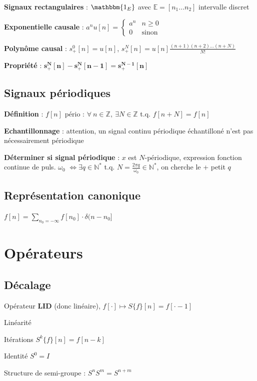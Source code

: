\textbf{Signaux rectangulaires} : $\mathbbm{1_E}$ avec $\mathbb{E} = [n_1\dots n_2]$ intervalle discret

\textbf{Exponentielle causale} : $a^nu[n] = \begin{cases} a^n & n\geq 0 \\0 & \text{sinon} \end{cases}$

\textbf{Polynôme causal} : $s_+^0[n] = u[n]$, $s_+^N[n] = u[n]\frac{(n+1)(n+2)\dots(n+N)}{N!}$

\textbf{Propriété} : $\mathbf{s_+^N[n] - s_+^N[n-1] = s_+^{N-1}[n]}$

\subsection*{Signaux périodiques}

\textbf{Définition} : $f[n]$ pério : $\forall \: n\in\mathbb{Z}, \: \exists N \in\mathbb{Z}$ t.q. $f[n+N] = f[n]$

\textbf{Echantillonnage} : attention, un signal continu périodique échantilloné n'est pas nécessairement périodique 

\textbf{Déterminer si signal périodique} : $x$ est $N$-périodique, expression fonction continue de puls. $\omega_0$ $\iff \exists q\in\mathbb{N}^*$ t.q. $N = \frac{2\pi q}{\omega_0} \in\mathbb{N}^*$, on cherche le + petit $q$ 

\subsection*{Représentation canonique}

$f[n] = \sum_{n_0=-\infty} f[n_0]\cdot\delta(n-n_0]$


\section{Opérateurs}

\subsection*{Décalage}

Opérateur \textbf{LID} (donc linéaire), $f[\cdot] \mapsto S\{f\}[n] = f[\cdot-1]$

\begin{myitemize}
    \item Linéarité
    \item Itérations $S^k\{f\}[n] = f[n-k]$
    \item Identité $S^0 = I$
    \item Structure de semi-groupe : $S^nS^m = S^{n+m}$
\end{myitemize}

